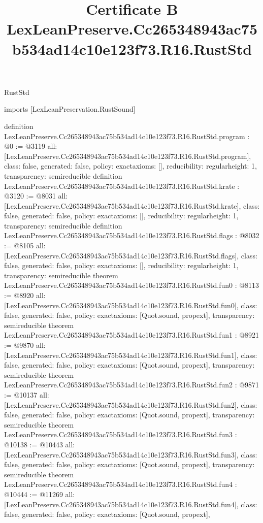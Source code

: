 \begin{lexlean}{RustStd}
\title{Certificate B LexLeanPreserve.Cc265348943ac75b534ad14c10e123f73.R16.RustStd}
\begin{coremodule}
imports [LexLeanPreservation.RustSound]

definition LexLeanPreserve.Cc265348943ac75b534ad14c10e123f73.R16.RustStd.program : @0 := @3119 {
  all: [LexLeanPreserve.Cc265348943ac75b534ad14c10e123f73.R16.RustStd.program],
  class: false,
  generated: false,
  policy: exact{axioms: []},
  reducibility: regular{height: 1},
  transparency: semireducible
}
definition LexLeanPreserve.Cc265348943ac75b534ad14c10e123f73.R16.RustStd.krate : @3120 := @8031 {
  all: [LexLeanPreserve.Cc265348943ac75b534ad14c10e123f73.R16.RustStd.krate],
  class: false,
  generated: false,
  policy: exact{axioms: []},
  reducibility: regular{height: 1},
  transparency: semireducible
}
definition LexLeanPreserve.Cc265348943ac75b534ad14c10e123f73.R16.RustStd.flags : @8032 := @8105 {
  all: [LexLeanPreserve.Cc265348943ac75b534ad14c10e123f73.R16.RustStd.flags],
  class: false,
  generated: false,
  policy: exact{axioms: []},
  reducibility: regular{height: 1},
  transparency: semireducible
}
theorem LexLeanPreserve.Cc265348943ac75b534ad14c10e123f73.R16.RustStd.fun0 : @8113 := @8920 {
  all: [LexLeanPreserve.Cc265348943ac75b534ad14c10e123f73.R16.RustStd.fun0],
  class: false,
  generated: false,
  policy: exact{axioms: [Quot.sound, propext]},
  transparency: semireducible
}
theorem LexLeanPreserve.Cc265348943ac75b534ad14c10e123f73.R16.RustStd.fun1 : @8921 := @9870 {
  all: [LexLeanPreserve.Cc265348943ac75b534ad14c10e123f73.R16.RustStd.fun1],
  class: false,
  generated: false,
  policy: exact{axioms: [Quot.sound, propext]},
  transparency: semireducible
}
theorem LexLeanPreserve.Cc265348943ac75b534ad14c10e123f73.R16.RustStd.fun2 : @9871 := @10137 {
  all: [LexLeanPreserve.Cc265348943ac75b534ad14c10e123f73.R16.RustStd.fun2],
  class: false,
  generated: false,
  policy: exact{axioms: [Quot.sound, propext]},
  transparency: semireducible
}
theorem LexLeanPreserve.Cc265348943ac75b534ad14c10e123f73.R16.RustStd.fun3 : @10138 := @10443 {
  all: [LexLeanPreserve.Cc265348943ac75b534ad14c10e123f73.R16.RustStd.fun3],
  class: false,
  generated: false,
  policy: exact{axioms: [Quot.sound, propext]},
  transparency: semireducible
}
theorem LexLeanPreserve.Cc265348943ac75b534ad14c10e123f73.R16.RustStd.fun4 : @10444 := @11269 {
  all: [LexLeanPreserve.Cc265348943ac75b534ad14c10e123f73.R16.RustStd.fun4],
  class: false,
  generated: false,
  policy: exact{axioms: [Quot.sound, propext]},
}
\end{coremodule}
\end{lexlean}
